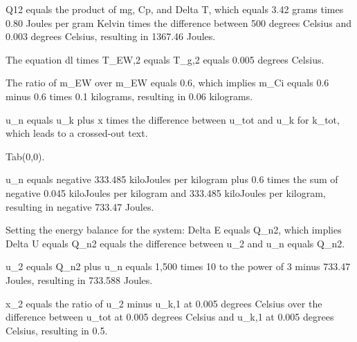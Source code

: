 Q12 equals the product of mg, Cp, and Delta T, which equals 3.42 grams times 0.80 Joules per gram Kelvin times the difference between 500 degrees Celsius and 0.003 degrees Celsius, resulting in 1367.46 Joules.

The equation dl times T_EW,2 equals T_g,2 equals 0.005 degrees Celsius.

The ratio of m_EW over m_EW equals 0.6, which implies m_Ci equals 0.6 minus 0.6 times 0.1 kilograms, resulting in 0.06 kilograms.

u_n equals u_k plus x times the difference between u_tot and u_k for k_tot, which leads to a crossed-out text.

Tab(0,0).

u_n equals negative 333.485 kiloJoules per kilogram plus 0.6 times the sum of negative 0.045 kiloJoules per kilogram and 333.485 kiloJoules per kilogram, resulting in negative 733.47 Joules.

Setting the energy balance for the system: Delta E equals Q_n2, which implies Delta U equals Q_n2 equals the difference between u_2 and u_n equals Q_n2.

u_2 equals Q_n2 plus u_n equals 1,500 times 10 to the power of 3 minus 733.47 Joules, resulting in 733.588 Joules.

x_2 equals the ratio of u_2 minus u_k,1 at 0.005 degrees Celsius over the difference between u_tot at 0.005 degrees Celsius and u_k,1 at 0.005 degrees Celsius, resulting in 0.5.